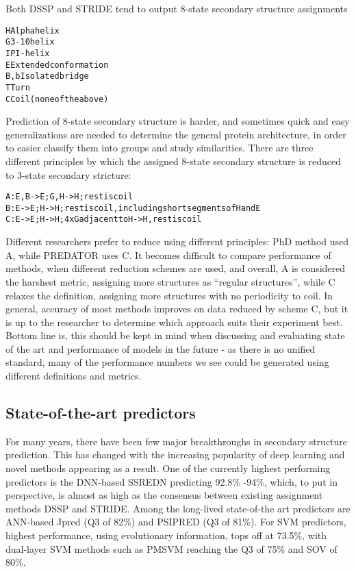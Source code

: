 \documentclass[12pt]{article}
\begin{document}
Both DSSP and STRIDE tend to output 8-state secondary structure assignments\cite{5}\\

\begin{alltt} 
  H	    Alpha helix
  G	    3-10 helix
  I	    PI-helix
  E	    Extended conformation
  B, b  Isolated bridge
  T	    Turn
  C	    Coil (none of the above)
          
\end{alltt}

\noindent Prediction of 8-state secondary structure is harder, and sometimes quick and easy generalizations are needed to determine the general protein architecture, in order to easier classify them into groups and study similarities. There are three different principles by which the assigned 8-state secondary structure is reduced to 3-state secondary stricture:\\
\begin{alltt}
	  A: E,B-> E; G,H-> H; rest is coil
	  B: E  -> E;   H-> H; rest is coil,including short segments of H and E
	  C: E  -> E;   H-> H; 4xG adjacent to H -> H,rest is coil
	  
\end{alltt}	    
Different researchers prefer to reduce using different principles: PhD method used A, while PREDATOR uses C. It becomes difficult to compare performance of methods, when different reduction schemes are used, and overall, A is considered the harshest metric, assigning more structures as “regular structures”, while C relaxes the definition, assigning more structures with no periodicity to coil. In general, accuracy of most methods improves on data reduced by scheme C, but it is up to the researcher to determine which approach suits their experiment best\cite{5}. Bottom line is, this should be kept in mind when discussing and evaluating state of the art and performance of models in the future - as there is no unified standard, many of the performance numbers we see could be generated using different definitions and metrics. 

\subsection{State-of-the-art predictors}

For many years, there have been few major breakthroughs in secondary structure prediction. This has changed with the increasing popularity of deep learning and novel methods appearing as a result.  One of the currently highest performing predictors is  the DNN-based SSREDN\cite{4} predicting  92.8\% -94\%, which, to put in perspective, is almost as high as the consensus between existing assignment methods DSSP and STRIDE.
Among the long-lived state-of-the art predictors are ANN-based Jpred (Q3 of 82\%) and PSIPRED\cite{6} (Q3 of 81\%). For SVM predictors, highest performance, using evolutionary information, tops off at 73.5\%, with dual-layer SVM methods such as PMSVM\cite{1} reaching the Q3 of 75\% and SOV of 80\%.
\end{document}
